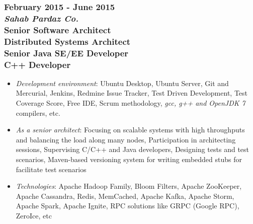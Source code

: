\documentclass[10pt,a4paper]{article}
\begin{document}
  \setlength{\leftskip}{0pt}
  \setlength{\rightskip}{0cm}
	  
\subsubsection{{February 2015 - June 2015} \\ \textnormal {\textit {Sahab Pardaz Co.}} \\ Senior Software Architect \\ { Distributed Systems Architect \\ Senior Java SE/EE Developer \\ C++ Developer}}
	\setlength{\leftskip}{0.5cm}
  \setlength{\rightskip}{1cm}
  \begin{itemize}
    \setlength{\rightskip}{1cm}
    \setlength\itemsep{0em}
    \item \small \textit {Development environment}: Ubuntu Desktop, Ubuntu Server, Git and Mercurial, Jenkins, Redmine Issue Tracker, Test Driven Development, Test Coverage Score, Free IDE, Scrum methodology, \textit {gcc, g++ and OpenJDK 7} compilers, etc.
    \item \small \textit {As a senior architect}: Focusing on scalable systems with high throughputs and balancing the load along many nodes, Participation in architecting sessions, Supervising C/C++ and Java developers, Designing tests and test scenarios, Maven-based versioning system for writing embedded stubs for facilitate test scenarios
    \item \small \textit {Technologies}: Apache Hadoop Family, Bloom Filters, Apache ZooKeeper, Apache Cassandra, Redis, MemCached, Apache Kafka, Apache Storm, Apache Spark, Apache Ignite, RPC solutions like GRPC (Google RPC), ZeroIce, etc
  \end{itemize}
  \setlength{\leftskip}{0pt}
  \setlength{\rightskip}{0cm}
	  
\end{document}
